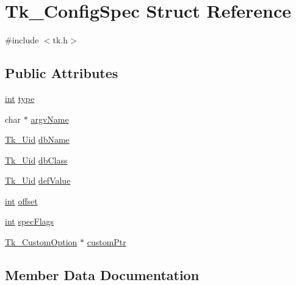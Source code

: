 \hypertarget{struct_tk___config_spec}{}\section{Tk\+\_\+\+Config\+Spec Struct Reference}
\label{struct_tk___config_spec}


{\ttfamily \#include $<$tk.\+h$>$}

\subsection*{Public Attributes}
\begin{DoxyCompactItemize}
\item 
\hyperlink{tk_8h_a83f82f76e7fed06f4c49d2db94028a6d}{int} \hyperlink{struct_tk___config_spec_a8c15f842b9585b72d6d410b9940fb466}{type}
\item 
char $\ast$ \hyperlink{struct_tk___config_spec_a73ae3f47967e7adaca96ce13b1e9a7eb}{argv\+Name}
\item 
\hyperlink{tk_8h_aab6f7e0c4f113c8e02feee260e7c4414}{Tk\+\_\+\+Uid} \hyperlink{struct_tk___config_spec_adddd909ae42e41aa39f4c744e2430bc3}{db\+Name}
\item 
\hyperlink{tk_8h_aab6f7e0c4f113c8e02feee260e7c4414}{Tk\+\_\+\+Uid} \hyperlink{struct_tk___config_spec_adc73766f556af28e7cf0b3d08819525a}{db\+Class}
\item 
\hyperlink{tk_8h_aab6f7e0c4f113c8e02feee260e7c4414}{Tk\+\_\+\+Uid} \hyperlink{struct_tk___config_spec_a3444fc1c691e8292450df2b0229fe27f}{def\+Value}
\item 
\hyperlink{tk_8h_a83f82f76e7fed06f4c49d2db94028a6d}{int} \hyperlink{struct_tk___config_spec_acd6e8e61c4363aa9bf961791f32b77a2}{offset}
\item 
\hyperlink{tk_8h_a83f82f76e7fed06f4c49d2db94028a6d}{int} \hyperlink{struct_tk___config_spec_a660c0a0ea239a8241157115eb3331a5a}{spec\+Flags}
\item 
\hyperlink{struct_tk___custom_option}{Tk\+\_\+\+Custom\+Option} $\ast$ \hyperlink{struct_tk___config_spec_a9adada94bc1967a849359798e91b348b}{custom\+Ptr}
\end{DoxyCompactItemize}


\subsection{Member Data Documentation}
